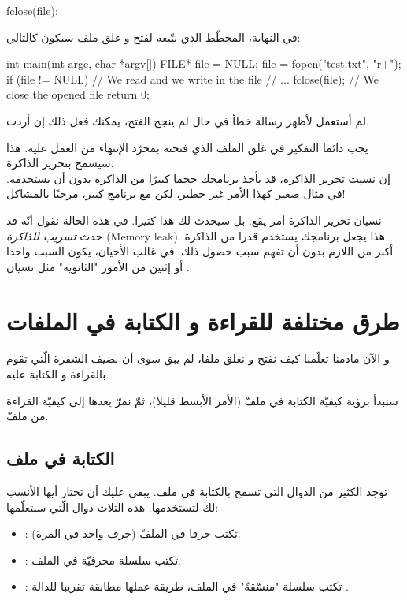 \begin{Csource}
fclose(file);
\end{Csource}

في النهاية، المخطّط الذي نتّبعه لفتح و غلق ملف سيكون كالتالي:

\begin{Csource}
int main(int argc, char *argv[])
{
	FILE* file = NULL;
	file = fopen("test.txt", "r+");
	if (file != NULL)
	{
    		// We read and we write in the file
    		// ...
    		fclose(file); // We close the opened file
	}
	return 0;
}
\end{Csource}

لم أستعمل
لأظهر رسالة خطأ في حال لم ينجح الفتح، يمكنك فعل ذلك إن أردت.

يجب دائما التفكير في غلق الملف الذي فتحته بمجرّد الإنتهاء من العمل عليه. هذا سيسمح بتحرير الذاكرة.\\
إن نسيت تحرير الذاكرة، قد يأخذ برنامجك حجما كبيرًا من الذاكرة بدون أن يستخدمه. في مثال صغير كهذا الأمر غير خطير، لكن مع برنامج كبير، مرحبًا بالمشاكل!

نسيان تحرير الذاكرة أمر يقع. بل سيحدث لك هذا كثيرا. في هذه الحالة نقول أنّه قد حدث
\textit{تسريب للذاكرة} (\textenglish{Memory leak}).
هذا يجعل برنامجك يستخدم قدرا من الذاكرة أكبر من اللازم بدون أن تفهم سبب حصول ذلك. في غالب الأحيان، يكون السبب واحدا أو إثنين من الأمور "الثانوية" مثل نسيان
.

\section{طرق مختلفة للقراءة و الكتابة في الملفات}

و الآن مادمنا تعلّمنا كيف نفتح و نغلق ملفا، لم يبق سوى أن نضيف الشفرة الّتي تقوم بالقراءة و الكتابة عليه.

سنبدأ برؤية كيفيّة الكتابة في ملفّ (الأمر الأبسط قليلا)، ثمّ نمرّ يعدها إلى كيفيّة القراءة من ملفّ.

\subsection{الكتابة في ملف}

توجد الكثير من الدوال التي تسمح بالكتابة في ملف. يبقى عليك أن تختار أيها الأنسب لك لتستخدمها.
هذه الثلاث دوال الّتي سنتعلّمها:

\begin{itemize}
  \item {}:
  تكتب حرفا في الملفّ
  (\underline{حرف واحد}
  في المرة).
  \item {}:
تكتب سلسلة محرفيّة في الملف.
  \item {}:
تكتب سلسلة "منسّقةً" في الملف، طريقة عملها مطابقة تقريبا للدالة
.
\end{itemize}

